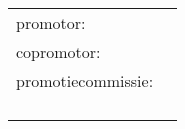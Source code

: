 \thispagestyle{empty}
\begin{flushleft}
\begin{tabular}{@{}ll}
promotor:         &  \\[1em]

copromotor:        &  \\[1em]

promotiecommissie: &  \\
                    &  \\
                    &  \\
                    &  \\
                    &  \\
\end{tabular}
\end{flushleft}
\vspace*{\fill}

\clearpage